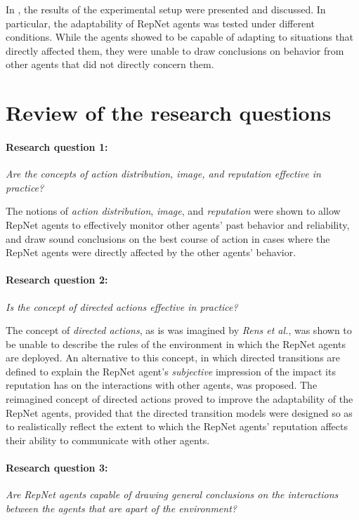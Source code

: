 In , the results of the experimental setup were presented and discussed. In particular, the adaptability of RepNet agents was tested under different conditions. While the agents showed to be capable of adapting to situations that directly affected them, they were unable to draw conclusions on behavior from other agents that did not directly concern them.
\section{Review of the research questions}
\paragraph{Research question 1:} \textit{Are the concepts of action distribution, image, and reputation effective in practice?}

\noindent The notions of \textit{action distribution}, \textit{image}, and \textit{reputation} were shown to allow RepNet agents to effectively monitor other agents' past behavior and reliability, and draw sound conclusions on the best course of action in cases where the RepNet agents were directly affected by the other agents' behavior.

\paragraph{Research question 2:} \textit{Is the concept of directed actions effective in practice?}

\noindent The concept of \textit{directed actions}, as is was imagined by \textit{Rens et al.}, was shown to be unable to describe the rules of the environment in which the RepNet agents are deployed. An alternative to this concept, in which directed transitions are defined to explain the RepNet agent's \textit{subjective} impression of the impact its reputation has on the interactions with other agents, was proposed. The reimagined concept of directed actions proved to improve the adaptability of the RepNet agents, provided that the directed transition models were designed so as to realistically reflect the extent to which the RepNet agents' reputation affects their ability to communicate with other agents.

\paragraph{Research question 3:} \textit{Are RepNet agents capable of drawing general conclusions on the interactions between the agents that are apart of the environment?}

